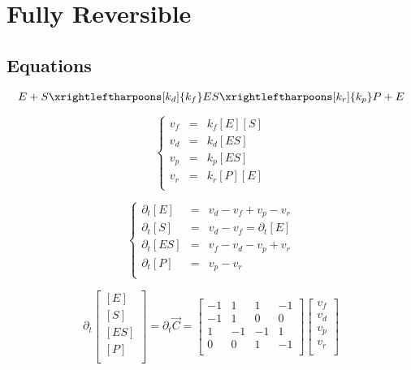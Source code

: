 \documentclass[aps,12pt]{revtex4}
\begin{document}
\section{Fully Reversible}

\subsection{Equations}

\begin{equation}
	E + S \xrightleftharpoons[k_d]{k_f} ES 
	\xrightleftharpoons[k_r]{k_p} P + E
\end{equation}

\begin{equation}
\left\lbrace
\begin{array}{rcl}
	v_f & =  & k_f [E][S] \\
	v_d & =  & k_d [ES]   \\
	v_p & =  & k_p [ES]   \\
	v_r & =  & k_r [P][E]  \\
\end{array}
\right.
\end{equation}

\begin{equation}
\left\lbrace
\begin{array}{rcl}
  \partial_t [E]  & = & v_d - v_f + v_p - v_r\\
  \partial_t [S]  & = & v_d - v_f = \partial_t [E]\\
  \partial_t [ES] & = & v_f - v_d - v_p + v_r\\ 
  \partial_t [P]  & = & v_p - v_r\\
\end{array}
\right.
\end{equation}

\begin{equation}
	\partial_t 
	\begin{bmatrix}
		[E]  \\
		[S]  \\
		[ES] \\
		[P]  \\
	\end{bmatrix}
	=	
	\partial_t \vec C = 
	\begin{bmatrix}
	-1 &  1 &  1 & -1 \\
	-1 &  1 &  0 &  0 \\
	 1 & -1 & -1 &  1 \\
	 0 &  0 &  1 & -1 \\
	\end{bmatrix}
	\begin{bmatrix}
		v_f\\
		v_d\\
		v_p\\
		v_r\\
	\end{bmatrix}
\end{equation}
\end{document}
